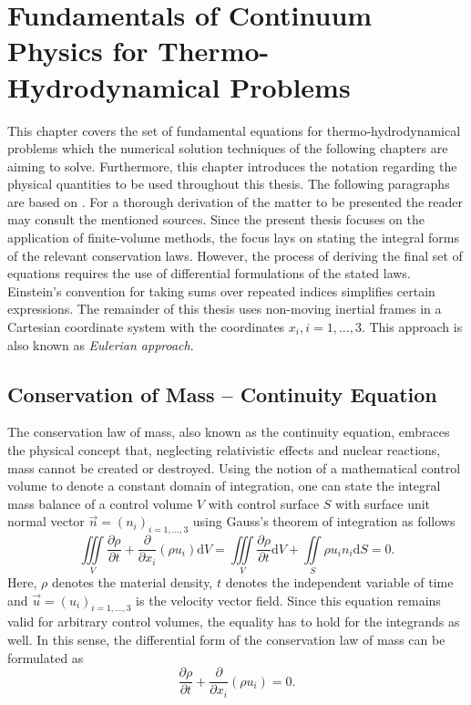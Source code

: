 \chapter{Fundamentals of Continuum Physics for Thermo-Hydrodynamical Problems}
\label{sec:fundamentals}

This chapter covers the set of fundamental equations for thermo-hydrodynamical problems which the numerical solution techniques of the following chapters are aiming to solve. Furthermore, this chapter introduces the notation regarding the physical quantities to be used throughout this thesis. The following paragraphs are based on \cite{andersson84,ferziger02,kundu12,spurk10}. For a thorough derivation of the matter to be presented the reader may consult the mentioned sources. Since the present thesis focuses on the application of finite-volume methods, the focus lays on stating the integral forms of the relevant conservation laws. However, the process of deriving the final set of equations requires the use of differential formulations of the stated laws. Einstein's convention for taking sums over repeated indices simplifies certain expressions. The remainder of this thesis uses non-moving inertial frames in a Cartesian coordinate system with the coordinates \( x_i, i=1,...,3 \). This approach is also known as \emph{Eulerian approach}.  

\section{Conservation of Mass -- Continuity Equation}

The conservation law of mass, also known as the continuity equation, embraces the physical concept that, neglecting relativistic effects and nuclear reactions, mass cannot be created or destroyed. Using the notion of a mathematical control volume to denote a constant domain of integration, one can state the integral mass balance of a control volume \(V\) with control surface \(S\) with surface unit normal vector \(\vec{n} = \left( n_i \right)_{i=1,\dots,3}\) using Gauss's theorem of integration as follows
\begin{displaymath}
  \iiint\limits_V \frac{\partial \rho}{\partial t} + \frac{\partial}{\partial x_i}\left( \rho u_i \right) \mathrm{d}V 
  =  \iiint\limits_V \frac{\partial \rho}{\partial t} \mathrm{d}V + \iint\limits_S \rho u_i n_i \mathrm{d}S
  = 0.
\end{displaymath}
Here, \( \rho \) denotes the material density, \(t\) denotes the independent variable of time and \(\vec{u} = \left( u_i \right)_{i=1,\dots,3}\) is the velocity vector field. Since this equation remains valid for arbitrary control volumes, the equality has to hold for the integrands as well. In this sense, the differential form of the conservation law of mass can be formulated as
\begin{equation}
  \label{eq:contifull}
  \frac{\partial \rho}{\partial t} + \frac{\partial}{\partial x_i}\left( \rho u_i \right)
  = 0.
\end{equation}

